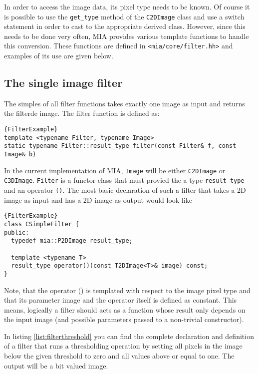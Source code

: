 \documentclass[english, 10pt, a4paper,headsepline,openany]{scrbook}
\begin{document}
In order to access the image data, its pixel type needs to be known. 
Of course it is possible to use the \texttt{get\_type} method of the \texttt{C2DImage} class and use
  a switch statement in order to cast to the appropriate derived class. 
However, since this needs to be done very often, MIA provides various template functions to handle 
  this conversion.
These functions are defined in \texttt{<mia/core/filter.hh>} and examples of its use are given below. 

\subsection{The single image filter}

The simples of all filter functions takes exactly one image as input and returns the filterde image. 
The filter function is defined as: 

\lstset{numbers=left,firstnumber=auto}
\begin{lstlisting}{FilterExample}
template <typename Filter, typename Image>
static typename Filter::result_type filter(const Filter& f, const Image& b)
\end{lstlisting}

In the current implementation of MIA, \texttt{Image} will be either \texttt{C2DImage} or \texttt{C3DImage}. 
\texttt{Filter} is a functor class that must provied the a type \texttt{result\_type} and an 
  operator \texttt{()}.
The most basic declaration of such a filter that takes a 2D image as input and has a 2D image as 
   output would look like 
\begin{lstlisting}{FilterExample}
class CSimpleFilter {
public: 
  typedef mia::P2DImage result_type; 
  
  template <typename T> 
  result_type operator()(const T2DImage<T>& image) const; 
}
\end{lstlisting}

Note, that the operator () is templated with respect to the image pixel type and that its parameter image 
  and the operator itself is defined as constant. 
This means, logically a filter should acts as a function whose result only depends on the input image 
(and possible parameters passed to a non-trivial constructor). 

In listing \ref{list:filterthreshold} you can find the complete declaration and definition of a filter 
  that runs a thresholding operation by setting all pixels in the image below the given threshold to zero 
  and all values above or equal to one. 
The output will be a bit valued image. 
\end{document}
